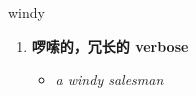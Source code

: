 
\begin{frame}
{\huge windy}
\begin{center}
\begin{enumerate}\Large
  \item \textbf{啰嗦的，冗长的 verbose}
  \begin{itemize}
    \item \em{\Large{a windy salesman}}
  \end{itemize}
\end{enumerate}
\end{center}
\end{frame}

